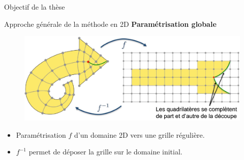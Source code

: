 \begin{frame}{Objectif de la thèse}
{    }
\end{frame}

\begin{frame}{Approche générale de la méthode en 2D}
    \centering
    \textbf{Paramétrisation globale}
    
    
    \begin{figure}
        \includegraphics[width=1.\linewidth]{img/new_images/gp_arrow_ex.png}
    \end{figure}

    \begin{itemize}
        \item Paramétrisation $f$ d'un domaine 2D vers une grille régulière.
        \item $f^{-1}$ permet de déposer la grille sur le domaine initial.
    \end{itemize}
\end{frame}

